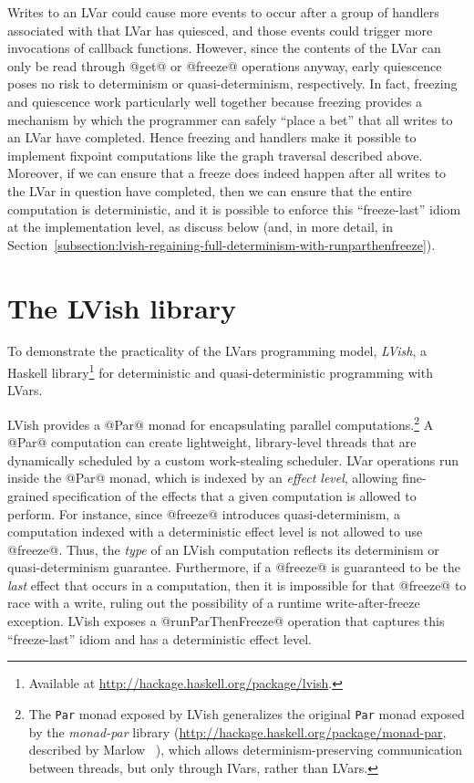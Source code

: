 Writes to an LVar could cause more events to occur after a group of handlers associated
with that LVar has quiesced, and those events could trigger more
invocations of callback functions.  However, since the contents of the
LVar can only be read through @get@ or @freeze@
operations anyway, early quiescence poses no risk to determinism or
quasi-determinism, respectively.  In fact, freezing and quiescence
work particularly well together because freezing provides a mechanism
by which the programmer can safely ``place a bet'' that all writes to an LVar
have completed.  Hence freezing and handlers make it possible to implement fixpoint
computations like the graph traversal described above.  Moreover, if
we can ensure that a freeze does indeed happen after all writes to the LVar in question have
completed, then we can ensure that the entire computation is deterministic,
and it is possible to enforce this ``freeze-last'' idiom at the
implementation level, as  discuss below (and, in more detail, in
Section~\ref{subsection:lvish-regaining-full-determinism-with-runparthenfreeze}).

\section{The LVish library}\label{s:intro-lvish}

To demonstrate the practicality of the LVars programming model, 
\emph{LVish}, a Haskell library\footnote{Available at
  \url{http://hackage.haskell.org/package/lvish}.}
for deterministic and quasi-deterministic programming with LVars.

LVish provides a @Par@ monad for encapsulating parallel computations.\footnote{The
  \lstinline|Par| monad exposed by LVish generalizes the original
  \lstinline|Par| monad exposed by the \emph{monad-par} library
  ({\url{http://hackage.haskell.org/package/monad-par}}, described by
  Marlow \etal~\cite{monad-par}), which allows determinism-preserving
  communication between threads, but only through IVars, rather than
  LVars.}
A @Par@ computation can create lightweight, library-level threads that
are dynamically scheduled by a custom work-stealing scheduler.
LVar operations run inside the @Par@ monad, which is
indexed by an \emph{effect level}, allowing fine-grained specification
of the effects that a given computation is allowed to perform.  For
instance, since @freeze@ introduces quasi-determinism, a computation
indexed with a deterministic effect level is not allowed to use
@freeze@.  Thus, the \emph{type} of an LVish computation reflects its
determinism or quasi-determinism guarantee.  Furthermore, if a
@freeze@ is guaranteed to be the \emph{last} effect that occurs in a
computation, then it is impossible for that @freeze@ to race with a
write, ruling out the possibility of a runtime write-after-freeze
exception.  LVish exposes a @runParThenFreeze@ operation that captures
this ``freeze-last'' idiom and has a deterministic effect level.

